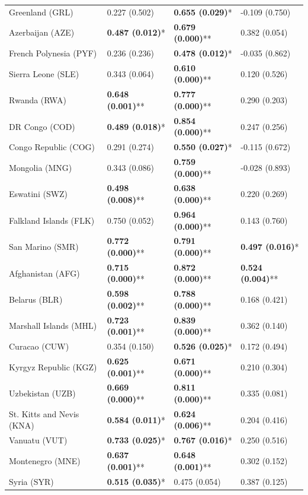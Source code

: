 \begin{longtable}{p{4cm}p{3cm}p{3cm}p{3cm}}
Greenland (GRL) & 0.227 (0.502) & \textbf{0.655 (0.029)}* & -0.109 (0.750) \\
Azerbaijan (AZE) & \textbf{0.487 (0.012)}* & \textbf{0.679 (0.000)}** & 0.382 (0.054) \\
French Polynesia (PYF) & 0.236 (0.236) & \textbf{0.478 (0.012)}* & -0.035 (0.862) \\
Sierra Leone (SLE) & 0.343 (0.064) & \textbf{0.610 (0.000)}** & 0.120 (0.526) \\
Rwanda (RWA) & \textbf{0.648 (0.001)}** & \textbf{0.777 (0.000)}** & 0.290 (0.203) \\
DR Congo (COD) & \textbf{0.489 (0.018)}* & \textbf{0.854 (0.000)}** & 0.247 (0.256) \\
Congo Republic (COG) & 0.291 (0.274) & \textbf{0.550 (0.027)}* & -0.115 (0.672) \\
Mongolia (MNG) & 0.343 (0.086) & \textbf{0.759 (0.000)}** & -0.028 (0.893) \\
Eswatini (SWZ) & \textbf{0.498 (0.008)}** & \textbf{0.638 (0.000)}** & 0.220 (0.269) \\
Falkland Islands (FLK) & 0.750 (0.052) & \textbf{0.964 (0.000)}** & 0.143 (0.760) \\
San Marino (SMR) & \textbf{0.772 (0.000)}** & \textbf{0.791 (0.000)}** & \textbf{0.497 (0.016)}* \\
Afghanistan (AFG) & \textbf{0.715 (0.000)}** & \textbf{0.872 (0.000)}** & \textbf{0.524 (0.004)}** \\
Belarus (BLR) & \textbf{0.598 (0.002)}** & \textbf{0.788 (0.000)}** & 0.168 (0.421) \\
Marshall Islands (MHL) & \textbf{0.723 (0.001)}** & \textbf{0.839 (0.000)}** & 0.362 (0.140) \\
Curacao (CUW) & 0.354 (0.150) & \textbf{0.526 (0.025)}* & 0.172 (0.494) \\
Kyrgyz Republic (KGZ) & \textbf{0.625 (0.001)}** & \textbf{0.671 (0.000)}** & 0.210 (0.304) \\
Uzbekistan (UZB) & \textbf{0.669 (0.000)}** & \textbf{0.811 (0.000)}** & 0.335 (0.081) \\
St. Kitts and Nevis (KNA) & \textbf{0.584 (0.011)}* & \textbf{0.624 (0.006)}** & 0.204 (0.416) \\
Vanuatu (VUT) & \textbf{0.733 (0.025)}* & \textbf{0.767 (0.016)}* & 0.250 (0.516) \\
Montenegro (MNE) & \textbf{0.637 (0.001)}** & \textbf{0.648 (0.001)}** & 0.302 (0.152) \\
Syria (SYR) & \textbf{0.515 (0.035)}* & 0.475 (0.054) & 0.387 (0.125) \\

\end{longtable}
